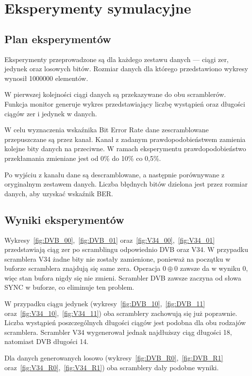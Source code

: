 \documentclass[polish, 11pt]{article}
\begin{document}
\section{Eksperymenty symulacyjne}
    \subsection{Plan eksperymentów}
        Eksperymenty przeprowadzone są dla każdego zestawu danych --- ciągi zer, jedynek oraz losowych bitów.
        Rozmiar danych dla którego przedstawiono wykresy wynosił 1000000 elementów.

        W pierwszej kolejności ciągi danych są przekazywane do obu scramblerów.
        Funkcja monitor generuje wykres przedstawiający liczbę wystąpień oraz długości ciągów zer i jedynek w danych.

        W celu wyznaczenia wskaźnika Bit Error Rate dane zescramblowane przepuszczane są przez kanał.
        Kanał z zadanym prawdopodobieństwem zamienia kolejne bity danych na przeciwne.
        W ramach eksperymentu prawdopodobieństwo przekłamania zmieniane jest od 0\% do 10\% co 0,5\%.

        Po wyjściu z kanału dane są descramblowane, a następnie porównywane z oryginalnym zestawem danych.
        Liczba błędnych bitów dzielona jest przez rozmiar danych, aby uzyskać wskaźnik BER.\
        
    \subsection{Wyniki eksperymentów}
        Wykresy~\ref{fig:DVB_00},~\ref{fig:DVB_01} oraz~\ref{fig:V34_00},~\ref{fig:V34_01} przedstawiają ciąg zer po scramblingu odpowiednio DVB oraz V34.
        W przypadku scramblera V34 żadne bity nie zostały zamienione, ponieważ na początku w buforze scramblera znajdują się same zera.
        Operacja \(0 \oplus 0\) zawsze da w wyniku 0, więc stan bufora nigdy się nie zmieni.
        Scrambler DVB zawsze zaczyna od słowa SYNC w buforze, co eliminuje ten problem.

        W przypadku ciągu jedynek (wykresy~\ref{fig:DVB_10},~\ref{fig:DVB_11} oraz~\ref{fig:V34_10},~\ref{fig:V34_11}) oba scramblery zachowują się już poprawnie.
        Liczba wystąpień poszczególnych długości ciągów jest podobna dla obu rodzajów scramblera. 
        Scrambler V34 wygenerował jednak najdłuższy ciąg długości 18, natomiast DVB długości 14.

        Dla danych generowanych losowo (wykresy~\ref{fig:DVB_R0},~\ref{fig:DVB_R1} oraz~\ref{fig:V34_R0},~\ref{fig:V34_R1})
        oba scramblery dały podobne wyniki.
\end{document}
